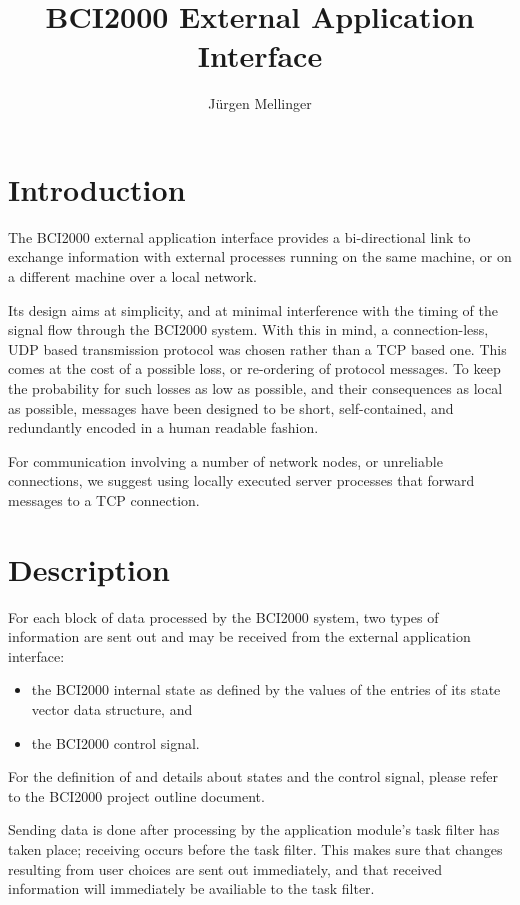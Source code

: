 \documentclass[12pt,a4paper,notitlepage]{article}
\title{BCI2000 External Application Interface}
\author{J\"{u}rgen Mellinger}
\begin{document}
\maketitle
\tableofcontents

\pagebreak
\section{Introduction}

The BCI2000 external application interface provides a bi-directional link to exchange 
information with external processes running on the same machine, or on a different machine
over a local network.

Its design aims at simplicity, and at minimal interference with the timing of the signal flow
through the BCI2000 system.
With this in mind, a connection-less, UDP based transmission protocol was chosen rather than a TCP based one.
This comes at the cost of a possible loss, or re-ordering of protocol messages.
To keep the probability for such losses as low as possible, and their consequences as
local as possible, messages have been designed to be short, self-contained, and redundantly
encoded in a human readable fashion.

For communication involving a number of network nodes, or unreliable connections, we suggest 
using locally executed server processes that forward messages to a TCP connection.

\section{Description}

For each block of data processed by the BCI2000 system, two types of information are sent out
and may be received from the external application interface:
\begin{itemize}
\item the BCI2000 internal state as defined by the values of the entries of its state vector data structure, and
\item the BCI2000 control signal.
\end{itemize}
For the definition of and details about states and the control signal, please refer to the BCI2000
project outline document.

Sending data is done after processing by the application module's task filter has taken place; receiving occurs before the task filter.
This makes sure that changes resulting from user choices are sent out immediately, and that 
received information will immediately be availiable to the task filter.
\end{document}
